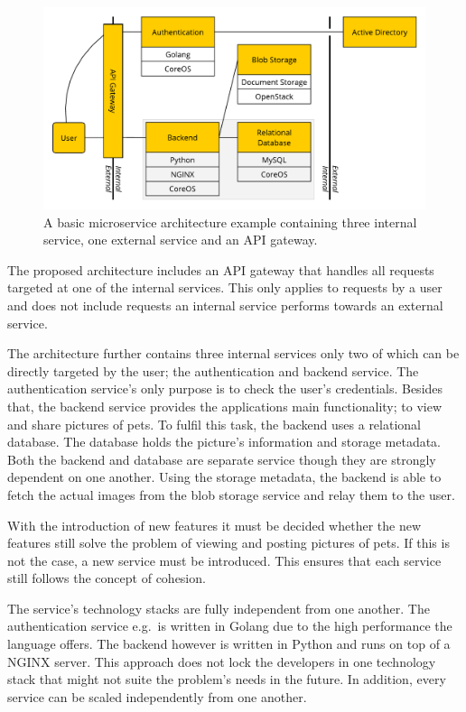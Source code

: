 \begin{figure}[H]
\begin{center}
  \includegraphics[scale=0.7]{images/figures/microservice_example.pdf}
\end{center}
\caption{A basic microservice architecture example containing three internal
service, one external service and an \acs{API} gateway.}
\label{fig:microservice_example}
\end{figure}

The proposed architecture includes an \ac{API} gateway that handles all requests
targeted at one of the internal services. This only applies to requests by a
user and does not include requests an internal service performs towards an
external service.

The architecture further contains three internal services only two of which can
be directly targeted by the user; the authentication and backend service. The
authentication service's only purpose is to check the user's credentials.
Besides that, the backend service provides the applications main functionality;
to view and share pictures of pets. To fulfil this task, the backend uses a
relational database. The database holds the picture's information and storage
metadata. Both the backend and database are separate service though they are
strongly dependent on one another. Using the storage metadata, the backend is
able to fetch the actual images from the blob storage service and relay them to
the user.

With the introduction of new features it must be decided whether the new
features still solve the problem of viewing and posting pictures of pets. If
this is not the case, a new service must be introduced. This ensures that each
service still follows the concept of cohesion.

The service's technology stacks are fully independent from one another. The
authentication service e.g.\ is written in Golang due to the high performance
the language offers. The backend however is written in Python and runs on top
of a NGINX server. This approach does not lock the developers in one technology
stack that might not suite the problem's needs in the future. In addition,
every service can be scaled independently from one another.

